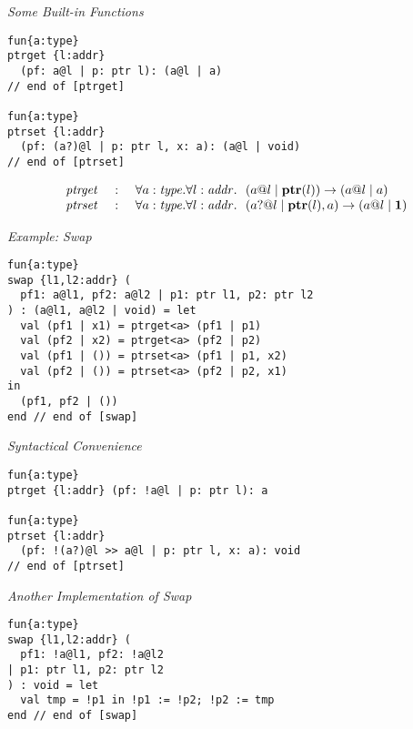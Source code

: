 \documentclass[pdf]{prosper}
\begin{document}
\def\tptr{\mbox{\bf ptr}}
\def\fptrget{{\it ptrget}}
\def\fptrset{{\it ptrset}}
\begin{slide}{\em Some Built-in Functions}
{\blue\begin{verbatim}
fun{a:type}
ptrget {l:addr}
  (pf: a@l | p: ptr l): (a@l | a)
// end of [ptrget]

fun{a:type}
ptrset {l:addr}
  (pf: (a?)@l | p: ptr l, x: a): (a@l | void)
// end of [ptrset]
\end{verbatim}
}
\[\begin{array}{rcl}
\fptrget &~:~& \forall a:\stype.\forall l:\saddr.~~(a@l \mid \tptr(l)) \timp (a@l \mid a) \\
\fptrset &~:~& \forall a:\stype.\forall l:\saddr.~~(a?@l \mid \tptr(l), a)\timp (a@l \mid \tunit) \\
\end{array}\]
\end{slide}
\begin{slide}{\em Example: {\it Swap}}
{\blue\begin{verbatim}
fun{a:type}
swap {l1,l2:addr} (
  pf1: a@l1, pf2: a@l2 | p1: ptr l1, p2: ptr l2
) : (a@l1, a@l2 | void) = let
  val (pf1 | x1) = ptrget<a> (pf1 | p1)
  val (pf2 | x2) = ptrget<a> (pf2 | p2)
  val (pf1 | ()) = ptrset<a> (pf1 | p1, x2)
  val (pf2 | ()) = ptrset<a> (pf2 | p2, x1)
in
  (pf1, pf2 | ())
end // end of [swap]
\end{verbatim}
}
\end{slide}
\begin{slide}{\em Syntactical Convenience}
{\blue\begin{verbatim}
fun{a:type}
ptrget {l:addr} (pf: !a@l | p: ptr l): a

fun{a:type}
ptrset {l:addr}
  (pf: !(a?)@l >> a@l | p: ptr l, x: a): void
// end of [ptrset]
\end{verbatim}
}
\end{slide}
\begin{slide}{\em Another Implementation of {\it Swap}}
{\blue\begin{verbatim}
fun{a:type}
swap {l1,l2:addr} (
  pf1: !a@l1, pf2: !a@l2
| p1: ptr l1, p2: ptr l2
) : void = let
  val tmp = !p1 in !p1 := !p2; !p2 := tmp
end // end of [swap]
\end{verbatim}
}
\end{slide}
\def\varrayView{{\it array\_v}}
\def\cArrayNil{{\it array\_v\_nil}}
\end{document}
